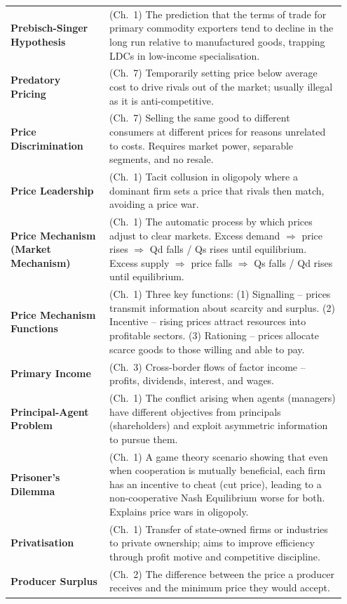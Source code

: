 \documentclass[11pt, a4paper, twoside]{book}
\begin{document}
\begin{longtable}{@{}>{\RaggedRight\arraybackslash}p{0.28\linewidth}>{\RaggedRight\arraybackslash}p{0.67\linewidth}@{}}
\textbf{Prebisch-Singer Hypothesis} & (Ch.~1) The prediction that the terms of trade for primary commodity exporters tend to decline in the long run relative to manufactured goods, trapping LDCs in low-income specialisation. \\
\textbf{Predatory Pricing} & (Ch.~7) Temporarily setting price below average cost to drive rivals out of the market; usually illegal as it is anti-competitive. \\
\textbf{Price Discrimination} & (Ch.~7) Selling the same good to different consumers at different prices for reasons unrelated to costs. Requires market power, separable segments, and no resale. \\
\textbf{Price Leadership} & (Ch.~1) Tacit collusion in oligopoly where a dominant firm sets a price that rivals then match, avoiding a price war. \\
\textbf{Price Mechanism (Market Mechanism)} & (Ch.~1) The automatic process by which prices adjust to clear markets. Excess demand $\Rightarrow$ price rises $\Rightarrow$ Qd falls / Qs rises until equilibrium. Excess supply $\Rightarrow$ price falls $\Rightarrow$ Qs falls / Qd rises until equilibrium. \\
\textbf{Price Mechanism Functions} & (Ch.~1) Three key functions: (1) Signalling -- prices transmit information about scarcity and surplus. (2) Incentive -- rising prices attract resources into profitable sectors. (3) Rationing -- prices allocate scarce goods to those willing and able to pay. \\
\textbf{Primary Income} & (Ch.~3) Cross-border flows of factor income -- profits, dividends, interest, and wages. \\
\textbf{Principal-Agent Problem} & (Ch.~1) The conflict arising when agents (managers) have different objectives from principals (shareholders) and exploit asymmetric information to pursue them. \\
\textbf{Prisoner's Dilemma} & (Ch.~1) A game theory scenario showing that even when cooperation is mutually beneficial, each firm has an incentive to cheat (cut price), leading to a non-cooperative Nash Equilibrium worse for both. Explains price wars in oligopoly. \\
\textbf{Privatisation} & (Ch.~1) Transfer of state-owned firms or industries to private ownership; aims to improve efficiency through profit motive and competitive discipline. \\
\textbf{Producer Surplus} & (Ch.~2) The difference between the price a producer receives and the minimum price they would accept. \\

\end{longtable}
\end{document}
